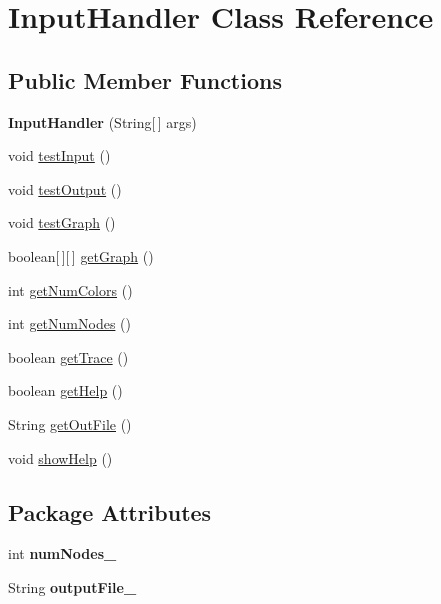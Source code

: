 \hypertarget{classInputHandler}{\section{\-Input\-Handler \-Class \-Reference}
\label{db/df6/classInputHandler}
}
\subsection*{\-Public \-Member \-Functions}
\begin{DoxyCompactItemize}
\item 
\hypertarget{classInputHandler_a9fa6c649650b395d7e503e320b09a3b8}{{\bfseries \-Input\-Handler} (\-String\mbox{[}$\,$\mbox{]} args)}\label{db/df6/classInputHandler_a9fa6c649650b395d7e503e320b09a3b8}

\item 
void \hyperlink{classInputHandler_a522659c575226af081f4d5f403e8d9b7}{test\-Input} ()
\item 
void \hyperlink{classInputHandler_a898cc58248862076ad8dcdf9d6a2318b}{test\-Output} ()
\item 
void \hyperlink{classInputHandler_a865593210db837bd58d3b75403fb97a3}{test\-Graph} ()
\item 
boolean\mbox{[}$\,$\mbox{]}\mbox{[}$\,$\mbox{]} \hyperlink{classInputHandler_a008131f31d9d60ce0bf68322f722198f}{get\-Graph} ()
\item 
int \hyperlink{classInputHandler_ad85a4df4b9daaa106ce6fc84fa31e4e7}{get\-Num\-Colors} ()
\item 
int \hyperlink{classInputHandler_a83f0bb96ffdadde07e7ed61db0a21aa4}{get\-Num\-Nodes} ()
\item 
boolean \hyperlink{classInputHandler_ae91026c105b48ae87859d8b4659f0bdd}{get\-Trace} ()
\item 
boolean \hyperlink{classInputHandler_ae08515ed26e4e9260cf4a21702bc3459}{get\-Help} ()
\item 
\-String \hyperlink{classInputHandler_a44c0174e8603ccbbce48981ed5d1a229}{get\-Out\-File} ()
\item 
void \hyperlink{classInputHandler_a8e2bc7e7ee5294f36b6801b5f204cc89}{show\-Help} ()
\end{DoxyCompactItemize}
\subsection*{\-Package \-Attributes}
\begin{DoxyCompactItemize}
\item 
\hypertarget{classInputHandler_a4be4a61ef6901e8ee2ac71b4b709da8c}{int {\bfseries num\-Nodes\-\_\-}}\label{db/df6/classInputHandler_a4be4a61ef6901e8ee2ac71b4b709da8c}

\item 
\hypertarget{classInputHandler_a23ec22f105b8d70d265601e2592ef8c9}{\-String {\bfseries output\-File\-\_\-}}\label{db/df6/classInputHandler_a23ec22f105b8d70d265601e2592ef8c9}

\end{DoxyCompactItemize}


